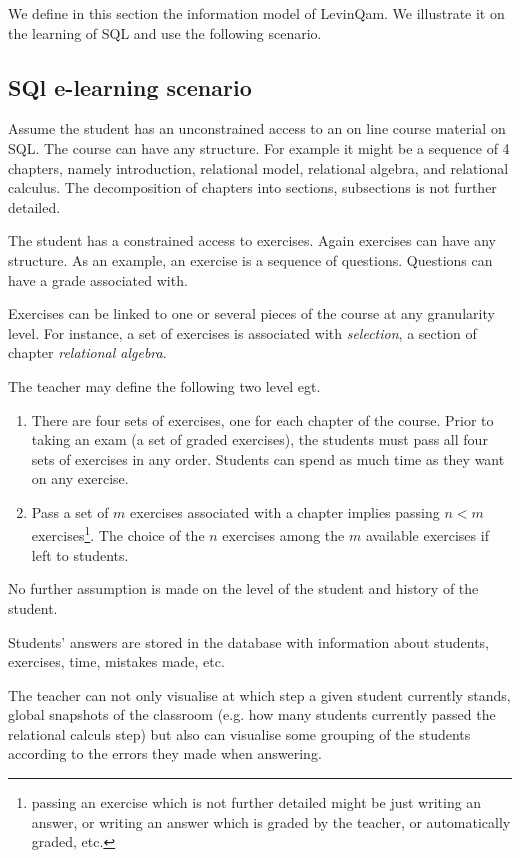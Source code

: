 We define in this section the information model of LevinQam. We
illustrate it on the learning of SQL and use  the following scenario. 
\subsection{SQl e-learning  scenario}
Assume the student has an unconstrained access to an on line course
material on SQL. The course can have any  structure. For example it
might be a sequence of 4 chapters, namely  introduction, relational
model, relational algebra, and relational calculus. The 
decomposition of chapters into sections, subsections is not further
detailed.

The student has a constrained access to exercises. Again
exercises can have any structure. As an example, an exercise is a
sequence of questions. Questions can have a grade associated with. 

Exercises can be linked to one or several pieces of the course at any
granularity level. For instance, a set of exercises is associated with
\emph{ selection}, a section of chapter \emph{ relational algebra}.

The teacher may define the following two level egt.
\begin{enumerate}
\item There are four sets of exercises, one for each chapter of the
course.  Prior to
taking an exam (a set of graded exercises),  the students must pass all
four sets of exercises in any order. Students can spend as much
time as they want on any exercise.
\item Pass a set of $m$ exercises associated with a chapter implies
passing $n<m$ exercises\footnote{passing an exercise which is not
further detailed might be just writing an answer, or writing an answer
which is graded by the teacher, or automatically graded, etc.}. The choice of the $n$ exercises among the $m$ available exercises if left to students. 
\end{enumerate}
No further assumption is made on the level of the student and history
of the student.

Students' answers are stored in the database with information about 
students,  exercises,  time, mistakes made, etc.

The teacher can not only visualise at which step  a given student
currently stands, global snapshots of the classroom (e.g. how many
students currently passed the relational calculs step) but also can
visualise some grouping of the students according to the errors they
made when answering.

